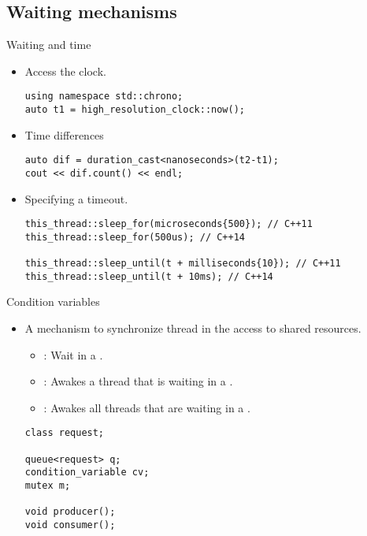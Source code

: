 \subsection{Waiting mechanisms}

\begin{frame}[t,fragile]{Waiting and time}
\begin{itemize}
  \item Access the clock.
\begin{lstlisting}
using namespace std::chrono;
auto t1 = high_resolution_clock::now();
\end{lstlisting}

  \item Time differences
\begin{lstlisting}
auto dif = duration_cast<nanoseconds>(t2-t1);
cout << dif.count() << endl;
\end{lstlisting}

  \item Specifying a timeout.
\begin{lstlisting}
this_thread::sleep_for(microseconds{500}); // C++11
this_thread::sleep_for(500us); // C++14

this_thread::sleep_until(t + milliseconds{10}); // C++11
this_thread::sleep_until(t + 10ms); // C++14
\end{lstlisting}
\end{itemize}
\end{frame}

\begin{frame}[t,fragile]{Condition variables}
\begin{itemize}
  \item A mechanism to synchronize thread in the access to shared resources.
    \begin{itemize}
      \item {}: Wait in a .
      \item {}: Awakes a thread that is waiting in a .
      \item {}: Awakes all threads that are waiting in a .
    \end{itemize}
\begin{lstlisting}
class request;

queue<request> q;
condition_variable cv;
mutex m;

void producer();
void consumer();
\end{lstlisting}
\end{itemize}
\end{frame}


